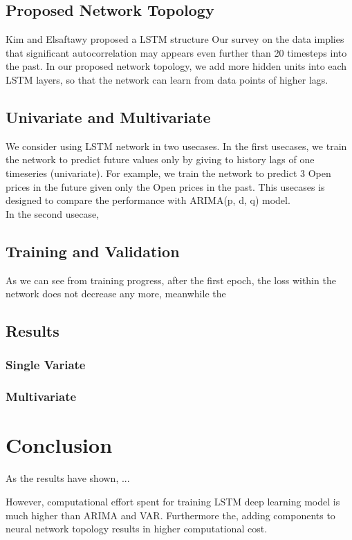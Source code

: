 \documentclass[12pt]{article}
\begin{document}
\subsection{Proposed Network Topology}
Kim and Elsaftawy \cite{kimy07lstm} proposed a LSTM structure 
Our survey on the data implies that significant autocorrelation may appears even
further than 20 timesteps into the past. In our proposed network topology, we
add more hidden units into each LSTM layers, so that the network can learn from
data points of higher lags.

\subsection{Univariate and Multivariate}
We consider using LSTM network in two usecases. In the first usecases, we train
the network to predict future values only by giving to history lags of one
timeseries (univariate). For example, we train the network to predict 3 Open
prices in the future given only the Open prices in the past. This usecases is
designed to compare the performance with ARIMA(p, d, q) model.\\
In the second usecase, 

\subsection{Training and Validation}
As we can see from training progress, after the first epoch, the loss within the
network does not decrease any more, meanwhile the 
\subsection{Results}

\subsubsection{Single Variate}

\subsubsection{Multivariate}

\section{Conclusion}
As the results have shown, ...

However, computational effort spent for training LSTM deep learning model is
much higher than ARIMA and VAR. Furthermore the, adding components to neural network
topology results in higher computational cost. 

\pagebreak


\end{document}
